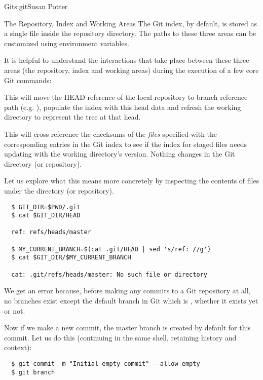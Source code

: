 \begin{aosachapter}{Git}{s:git}{Susan Potter}
\begin{aosasect1}{The Repository, Index and Working Areas}
The Git index, by default, is stored as a single file inside the
repository directory. The paths to these three areas can be customized
using environment variables.

It is helpful to understand the interactions that take place between these
three areas (the repository, index and working areas) during the execution
of a few core Git commands:

\begin{aosaitemize}
  \item {} 

  This will move the HEAD reference of the local repository to branch
  reference path (e.g. ), populate the index with
  this head data and refresh the working directory to represent the tree
  at that head.

  \item {}

  This will cross reference the checksums of the \emph{files}
  specified with the corresponding entries in the Git index to see if the
  index for staged files needs updating with the working directory's
  version. Nothing changes in the Git directory (or repository).
\end{aosaitemize}

Let us explore what this means more concretely by inspecting the contents of
files under the  directory (or repository).

\begin{verbatim}
  $ GIT_DIR=$PWD/.git
  $ cat $GIT_DIR/HEAD

  ref: refs/heads/master

  $ MY_CURRENT_BRANCH=$(cat .git/HEAD | sed 's/ref: //g')
  $ cat $GIT_DIR/$MY_CURRENT_BRANCH

  cat: .git/refs/heads/master: No such file or directory
\end{verbatim}

\noindent We get an error because, before making any commits to a Git repository at
all, no branches exist except the default branch in Git which is ,
whether it exists yet or not.

Now if we make a new commit, the master branch is created by default for
this commit. Let us do this (continuing in the same shell, retaining
history and context):

\begin{verbatim}
  $ git commit -m "Initial empty commit" --allow-empty
  $ git branch


\end{verbatim}
\end{aosasect1}
\end{aosachapter}
